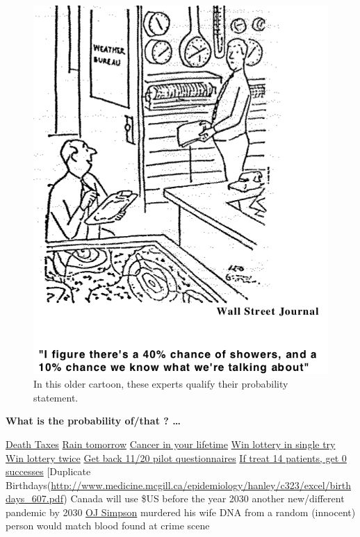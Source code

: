 \documentclass[]{book}
\begin{document}
\begin{itemize}
\begin{figure}
   {\centering \includegraphics[width=4.78in]{images/40PercentChanceOfShowers} 

   }

   \caption{In this older cartoon, these experts qualify their probability statement.}\label{fig:unnamed-chunk-38}
   \end{figure}
\end{itemize}

\textbf{What is the probability of/that ? \ldots{}}

\href{https://en.wikipedia.org/wiki/Death_and_taxes_(idiom)}{Death \textbar{} Taxes} \textbar{} \href{https://www.ncbi.nlm.nih.gov/pubmed/16022695}{Rain tomorrow} \textbar{} \href{https://www.cancer.org/cancer/cancer-basics/lifetime-probability-of-developing-or-dying-from-cancer.html}{Cancer in your lifetime} \textbar{} \href{https://loteries.lotoquebec.com/en/lotteries/quebec-49}{Win lottery in single try} \textbar{} \href{http://www.medicine.mcgill.ca/epidemiology/hanley/Reprints/jumping_to_coincidences.pdf}{Win lottery twice} \textbar{} \href{http://www.medicine.mcgill.ca/epidemiology/hanley/c607/ch06/mm_ch_06.pdf\#page=6}{Get back 11/20 pilot questionnaires} \textbar{} \href{https://books.google.ca/books?id=WdDKBQAAQBAJ\&pg=PA65\&dq=0/14+phase+2+trials+gehan+design\&hl=en\&sa=X\&ved=0ahUKEwiioNy7s4fpAhUjmXIEHagrCZQQ6AEILjAB\#v=onepage\&q=0\%2F14\%20phase\%202\%20trials\%20gehan\%20design\&f=false}{If treat 14 patients, get 0 successes} \textbar{} {[}Duplicate Birthdays(\url{http://www.medicine.mcgill.ca/epidemiology/hanley/c323/excel/birthdays_607.pdf}) \textbar{} Canada will use \$US before the year 2030 \textbar{} another new/different pandemic by 2030 \textbar{} \href{https://en.wikipedia.org/wiki/O._J._Simpson_murder_case}{OJ Simpson} murdered his wife \textbar{} DNA from a random (innocent) person would match blood found at crime scene
\end{document}
